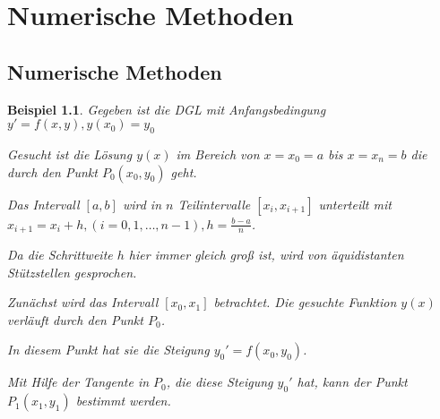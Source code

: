 \documentclass[fontset=ubuntu,12pt,a4paper]{scrreprt}
\newtheorem{beispiel}[defi]{Beispiel}
\begin{document}
\chapter{Numerische Methoden}
    \section{Numerische Methoden}
    \begin{beispiel}
        Gegeben ist die DGL mit Anfangsbedingung \(y'=f(x,y), y(x_0)=y_0\)
     
        Gesucht ist die Lösung \(y(x)\) im Bereich von \(x=x_0=a\) bis \(x=x_n=b\) die durch den Punkt \(P_0(x_0,y_0)\) geht.

        Das Intervall \(\left[a,b\right]\) wird in \(n\) Teilintervalle \(\left[x_i,x_{i+1}\right]\) unterteilt mit \(x_{i+1}=x_i+h, (i=0,1,\dots,n-1), h=\frac{b-a}{n}\).
        

        Da die Schrittweite \(h\) hier immer gleich groß ist, wird von äquidistanten Stützstellen gesprochen.

        Zunächst wird das Intervall \(\left[x_0,x_1\right]\) betrachtet. Die gesuchte Funktion \(y(x)\) verläuft durch den Punkt \(P_0\).

        In diesem Punkt hat sie die Steigung \(y_0'=f(x_0,y_0)\).

        Mit Hilfe der Tangente in \(P_0\), die diese Steigung \(y_0'\) hat, kann der Punkt \(P_1(x_1,y_1)\) bestimmt werden.

        \vspace{2.5em}
        


\end{beispiel}
\end{document}
